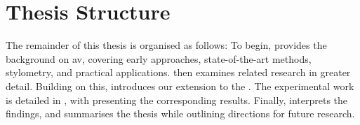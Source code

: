 \section{Thesis Structure}
\label{sec:thesis_structure}

The remainder of this thesis is organised as follows: 
To begin,  provides the background on \ac{av}, covering early approaches, state-of-the-art methods, stylometry, and practical applications.
 then examines related research in greater detail.
Building on this,  introduces our extension to the \impAppr{}.
The experimental work is detailed in , with  presenting the corresponding results.
Finally,  interprets the findings, and  summarises the thesis while outlining directions for future research.
